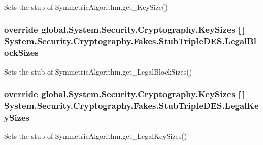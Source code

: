 Sets the stub of Symmetric\-Algorithm.\-get\-\_\-\-Key\-Size()

\hypertarget{class_system_1_1_security_1_1_cryptography_1_1_fakes_1_1_stub_triple_d_e_s_a7453edcf439bc43628be285d9a277909}{
\subsubsection[{Legal\-Block\-Sizes}]{\setlength{\rightskip}{0pt plus 5cm}override global.\-System.\-Security.\-Cryptography.\-Key\-Sizes \mbox{[}$\,$\mbox{]} System.\-Security.\-Cryptography.\-Fakes.\-Stub\-Triple\-D\-E\-S.\-Legal\-Block\-Sizes\hspace{0.3cm}{\ttfamily [get]}}}\label{class_system_1_1_security_1_1_cryptography_1_1_fakes_1_1_stub_triple_d_e_s_a7453edcf439bc43628be285d9a277909}


Sets the stub of Symmetric\-Algorithm.\-get\-\_\-\-Legal\-Block\-Sizes()

\hypertarget{class_system_1_1_security_1_1_cryptography_1_1_fakes_1_1_stub_triple_d_e_s_a494fd6da84163f2993dd494c2fa56af8}{
\subsubsection[{Legal\-Key\-Sizes}]{\setlength{\rightskip}{0pt plus 5cm}override global.\-System.\-Security.\-Cryptography.\-Key\-Sizes \mbox{[}$\,$\mbox{]} System.\-Security.\-Cryptography.\-Fakes.\-Stub\-Triple\-D\-E\-S.\-Legal\-Key\-Sizes\hspace{0.3cm}{\ttfamily [get]}}}\label{class_system_1_1_security_1_1_cryptography_1_1_fakes_1_1_stub_triple_d_e_s_a494fd6da84163f2993dd494c2fa56af8}


Sets the stub of Symmetric\-Algorithm.\-get\-\_\-\-Legal\-Key\-Sizes()


